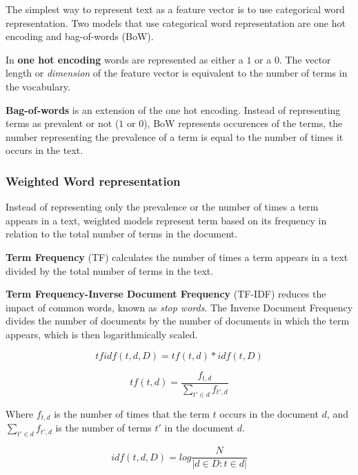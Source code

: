 \documentclass[oneside, english, bibtex]{kththesis}
\begin{document}
The simplest way to represent text as a feature vector is to use categorical word representation. Two models that use categorical word representation are one hot encoding and bag-of-words (BoW). 

In \textbf{one hot encoding} words are represented as either a $1$ or a $0$. The vector length or \textit{dimension} of the feature vector is equivalent to the number of terms in the vocabulary. 

 \textbf{Bag-of-words} is an extension of the one hot encoding. Instead of representing terms as prevalent or not ($1$ or $0$), BoW represents occurences of the terms, the number representing the prevalence of a term is equal to the number of times it occurs in the text.

\subsubsection{Weighted Word representation}

Instead of representing only the prevalence or the number of times a term appears in a text, weighted models represent term based on its frequency in relation to the total number of terms in the document. 

\textbf{Term Frequency} (TF) calculates the number of times a term appears in a text divided by the total number of terms in the text.

\textbf{Term Frequency-Inverse Document Frequency} (TF-IDF) reduces the impact of common words, known as \textit{stop words}. The Inverse Document Frequency divides the number of documents by the number of documents in which the term appears, which is then logarithmically scaled. 

\begin{equation}
	tfidf(t,d,D) = tf(t,d) * idf(t,D)
  	\label{eqn:tf-idf}
\end{equation}


\begin{equation}
	tf(t,d) = \frac{f_{t,d}}{\sum_{t' \in d} f_{t', d}} 
  	\label{eqn:tf}
\end{equation}

Where $f_{t,d}$ is the number of times that the term $t$ occurs in the document $d$, and $\sum_{t' \in d} f_{t', d}$ is the number of terms $t'$ in the document $d$.

\begin{equation}
	idf(t,d,D) = log \frac{N}{|d \in D : t \in d|}
  	\label{eqn:idf}
\end{equation}
\end{document}
